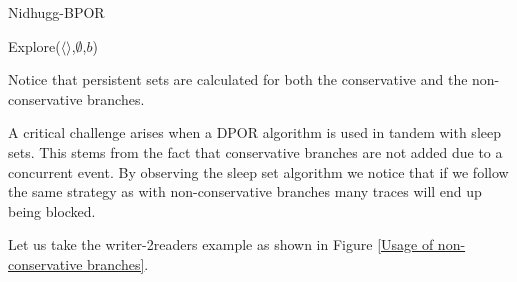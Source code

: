 \begin{algorithm}
    \caption{Nidhugg-BPOR}
    \label{Nidhugg BPOR}
    Explore($\langle \rangle$,$\emptyset$,$b$)\;
\end{algorithm}

Notice that persistent sets are calculated for both the conservative and the non-conservative branches.

A critical challenge arises when a DPOR algorithm is used in tandem with sleep sets. This stems from the fact that
conservative branches are not added due to a concurrent event. By observing the sleep set algorithm we notice that if we
follow the same strategy as with non-conservative branches many traces will end up being blocked.

Let us take the writer-2readers example as shown in Figure \ref{Usage of non-conservative branches}.

